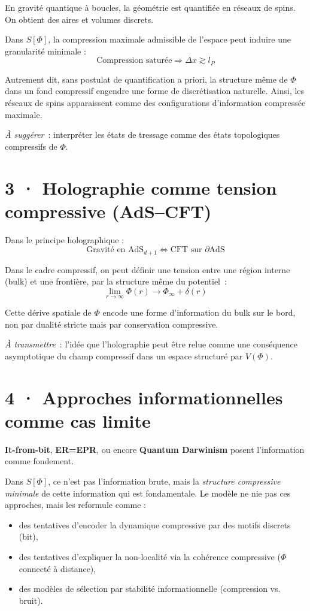 \documentclass[11pt]{article}
\begin{document}
En gravité quantique à boucles, la géométrie est quantifiée en réseaux de spins. On obtient des aires et volumes discrets.

Dans $S[\Phi]$, la compression maximale admissible de l’espace peut induire une granularité minimale :
\[
\text{Compression saturée} \Rightarrow \Delta x \gtrsim l_P
\]

Autrement dit, sans postulat de quantification a priori, la structure même de $\Phi$ dans un fond compressif engendre une forme de discrétisation naturelle. Ainsi, les réseaux de spins apparaissent comme des configurations d’information compressée maximale.

\emph{À suggérer} : interpréter les états de tressage comme des états topologiques compressifs de $\Phi$.

\section{3 · Holographie comme tension compressive (AdS–CFT)}

Dans le principe holographique :
\[
\text{Gravité en } \text{AdS}_{d+1} \Leftrightarrow \text{CFT sur } \partial\text{AdS}
\]

Dans le cadre compressif, on peut définir une tension entre une région interne (bulk) et une frontière, par la structure même du potentiel :
\[
\lim_{r \to \infty} \Phi(r) \to \Phi_{\infty} + \delta(r)
\]

Cette dérive spatiale de $\Phi$ encode une forme d’information du bulk sur le bord, non par dualité stricte mais par conservation compressive.

\emph{À transmettre} : l’idée que l’holographie peut être relue comme une conséquence asymptotique du champ compressif dans un espace structuré par $V(\Phi)$.

\section{4 · Approches informationnelles comme cas limite}

\textbf{It-from-bit}, \textbf{ER=EPR}, ou encore \textbf{Quantum Darwinism} posent l’information comme fondement.

Dans $S[\Phi]$, ce n’est pas l’information brute, mais la \emph{structure compressive minimale} de cette information qui est fondamentale. Le modèle ne nie pas ces approches, mais les reformule comme :
\begin{itemize}
  \item des tentatives d’encoder la dynamique compressive par des motifs discrets (bit),
  \item des tentatives d’expliquer la non-localité via la cohérence compressive ($\Phi$ connecté à distance),
  \item des modèles de sélection par stabilité informationnelle (compression vs. bruit).
\end{itemize}
\end{document}
